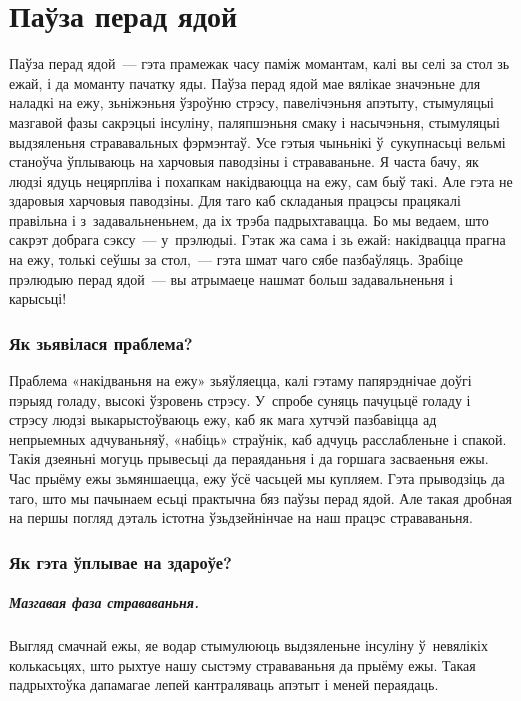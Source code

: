 \chapter{Паўза перад ядой}

Паўза перад ядой~--- гэта прамежак часу паміж момантам, калі вы селі за стол зь ежай, і да моманту пачатку яды. Паўза перад ядой мае вялікае значэньне для наладкі на ежу, зьніжэньня ўзроўню стрэсу, павелічэньня апэтыту, стымуляцыі мазгавой фазы сакрэцыі інсуліну, паляпшэньня смаку і насычэньня, стымуляцыі выдзяленьня стрававальных фэрмэнтаў. Усе гэтыя чыньнікі ў~сукупнасьці вельмі станоўча ўплываюць на харчовыя паводзіны і страваваньне. Я часта бачу, як людзі ядуць нецярпліва і похапкам накідваюцца на ежу, сам быў такі. Але гэта не здаровыя харчовыя паводзіны. Для таго каб складаныя працэсы працякалі правільна і з~задавальненьнем, да іх трэба падрыхтавацца. Бо мы ведаем, што сакрэт добрага сэксу~--- у~прэлюдыі. Гэтак жа сама і зь ежай: накідвацца прагна на ежу, толькі сеўшы за стол,~--- гэта шмат чаго сябе пазбаўляць. Зрабіце прэлюдыю перад ядой~--- вы атрымаеце нашмат больш задавальненьня і карысьці!

\subsection{Як зьявілася праблема?}

Праблема «накідваньня на ежу» зьяўляецца, калі гэтаму папярэднічае доўгі пэрыяд голаду, высокі ўзровень стрэсу. У~спробе суняць пачуцьцё голаду і стрэсу людзі выкарыстоўваюць ежу, каб як мага хутчэй пазбавіцца ад непрыемных адчуваньняў, «набіць» страўнік, каб адчуць расслабленьне і спакой. Такія дзеяньні могуць прывесьці да пераяданьня і да горшага засваеньня ежы.
Час прыёму ежы зьмяншаецца, ежу ўсё часьцей мы купляем. Гэта прыводзіць да таго, што мы пачынаем есьці практычна бяз паўзы перад ядой. Але такая дробная на першы погляд дэталь істотна ўзьдзейнінчае на наш працэс страваваньня.

\subsection{Як гэта ўплывае на здароўе?}

\paragraph{Мазгавая фаза страваваньня.}
Выгляд смачнай ежы, яе водар стымулююць выдзяленьне інсуліну ў~невялікіх колькасьцях, што рыхтуе нашу сыстэму страваваньня да прыёму ежы. Такая падрыхтоўка дапамагае лепей кантраляваць апэтыт і меней пераядаць.

